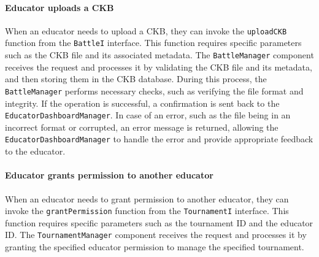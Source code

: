 \paragraph{Educator uploads a CKB}
When an educator needs to upload a CKB, they can invoke the \verb|uploadCKB| function from the \verb|BattleI| interface. This function requires specific parameters such as the CKB file and its associated metadata. 
The \verb|BattleManager| component receives the request and processes it by validating the CKB file and its metadata, and then storing them in the CKB database. 
During this process, the \verb|BattleManager| performs necessary checks, such as verifying the file format and integrity. If the operation is successful, a confirmation is sent back to the \verb|EducatorDashboardManager|. 
In case of an error, such as the file being in an incorrect format or corrupted, an error message is returned, allowing the \verb|EducatorDashboardManager| to handle the error and provide appropriate feedback to the educator.

\paragraph{Educator grants permission to another educator}
When an educator needs to grant permission to another educator, they can invoke the \verb|grantPermission| function from the \verb|TournamentI| interface. This function requires specific parameters such as the tournament ID and the educator ID.
The \verb|TournamentManager| component receives the request and processes it by granting the specified educator permission to manage the specified tournament.

